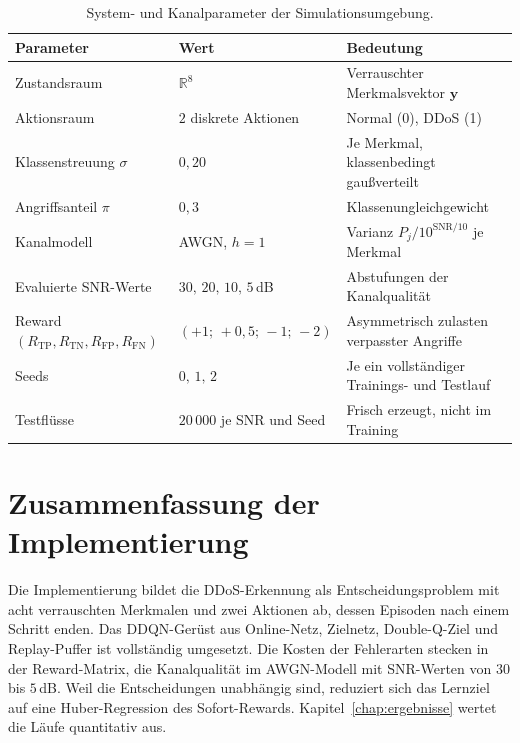 \begin{table}[!t]
	\bigskip
	\renewcommand{\arraystretch}{1.25}
	\caption{System- und Kanalparameter der Simulationsumgebung.}
	\label{tab:system_parameters}
	\begin{tabular}{L{4.4cm}L{3.6cm}L{5.0cm}}
		\toprule
		\textbf{Parameter} & \textbf{Wert} & \textbf{Bedeutung} \\
		\midrule
		Zustandsraum & $\mathbb{R}^{8}$ & Verrauschter Merkmalsvektor $\mathbf{y}$ \\
		Aktionsraum & $2$ diskrete Aktionen & Normal (0), DDoS (1) \\
		Klassenstreuung $\sigma$ & $0{,}20$ & Je Merkmal, klassenbedingt gaußverteilt \\
		Angriffsanteil $\pi$ & $0{,}3$ & Klassenungleichgewicht \\
		Kanalmodell & AWGN, $h=1$ & Varianz $P_j/10^{\mathrm{SNR}/10}$ je Merkmal \\
		Evaluierte SNR-Werte & $30,\,20,\,10,\,5$\,dB & Abstufungen der Kanalqualität \\
		Reward\newline $(R_{\mathrm{TP}},R_{\mathrm{TN}},R_{\mathrm{FP}},R_{\mathrm{FN}})$ & $(+1;\,+0{,}5;\,-1;\,-2)$ & Asymmetrisch zulasten verpasster Angriffe \\
		Seeds & $0,\,1,\,2$ & Je ein vollständiger Trainings- und Testlauf \\
		Testflüsse & $20\,000$ je SNR und Seed & Frisch erzeugt, nicht im Training \\
		\bottomrule
	\end{tabular}
\end{table}

\section{Zusammenfassung der Implementierung}
\label{sec:implementierung_zusammenfassung}

Die Implementierung bildet die DDoS-Erkennung als Entscheidungsproblem mit acht verrauschten Merkmalen und zwei Aktionen ab, dessen Episoden nach einem Schritt enden. Das DDQN-Gerüst aus Online-Netz, Zielnetz, Double-Q-Ziel und Replay-Puffer ist vollständig umgesetzt. Die Kosten der Fehlerarten stecken in der Reward-Matrix, die Kanalqualität im AWGN-Modell mit SNR-Werten von $30$ bis $5$\,dB. Weil die Entscheidungen unabhängig sind, reduziert sich das Lernziel auf eine Huber-Regression des Sofort-Rewards. Kapitel~\ref{chap:ergebnisse} wertet die Läufe quantitativ aus.
